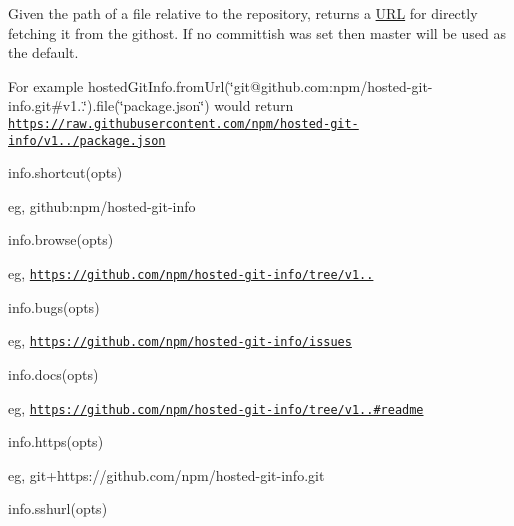 Given the path of a file relative to the repository, returns a \mbox{\hyperlink{namespace_u_r_l}{U\+RL}} for directly fetching it from the githost. If no committish was set then {\ttfamily master} will be used as the default.

For example {\ttfamily hosted\+Git\+Info.\+from\+Url(\char`\"{}git@github.\+com\+:npm/hosted-\/git-\/info.\+git\#v1..\char`\"{}).file(\char`\"{}package.\+json\char`\"{})} would return {\ttfamily \href{https://raw.githubusercontent.com/npm/hosted-git-info/v1.0.0/package.json}{\tt https\+://raw.\+githubusercontent.\+com/npm/hosted-\/git-\/info/v1../package.\+json}}


\begin{DoxyItemize}
\item info.\+shortcut(opts)
\end{DoxyItemize}

eg, {\ttfamily github\+:npm/hosted-\/git-\/info}


\begin{DoxyItemize}
\item info.\+browse(opts)
\end{DoxyItemize}

eg, {\ttfamily \href{https://github.com/npm/hosted-git-info/tree/v1.2.0}{\tt https\+://github.\+com/npm/hosted-\/git-\/info/tree/v1..}}


\begin{DoxyItemize}
\item info.\+bugs(opts)
\end{DoxyItemize}

eg, {\ttfamily \href{https://github.com/npm/hosted-git-info/issues}{\tt https\+://github.\+com/npm/hosted-\/git-\/info/issues}}


\begin{DoxyItemize}
\item info.\+docs(opts)
\end{DoxyItemize}

eg, {\ttfamily \href{https://github.com/npm/hosted-git-info/tree/v1.2.0#readme}{\tt https\+://github.\+com/npm/hosted-\/git-\/info/tree/v1..\#readme}}


\begin{DoxyItemize}
\item info.\+https(opts)
\end{DoxyItemize}

eg, {\ttfamily git+https\+://github.com/npm/hosted-\/git-\/info.\+git}


\begin{DoxyItemize}
\item info.\+sshurl(opts)
\end{DoxyItemize}

